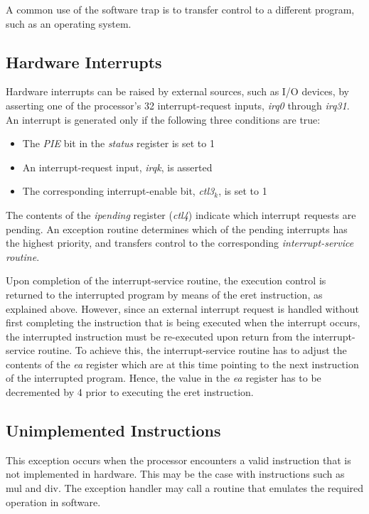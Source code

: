 \documentclass[11pt, twoside, pdftex]{article}
\begin{document}
A common use of the software trap is to transfer control to a different program,
such as an operating system.

\subsection{Hardware Interrupts}
\label{sec:interrupts}

Hardware interrupts can be raised by external sources, such as I/O devices,
by asserting one of the processor's 32 interrupt-request inputs, {\it irq0}
through {\it irq31}. An interrupt is generated only if the following three
conditions are true:
\begin{itemize}
\item The {\it PIE} bit in the {\it status} register is set to 1
\item An interrupt-request input, {\it irqk}, is asserted
\item The corresponding interrupt-enable bit, {\it ctl3}$_k$, is set to 1
\end{itemize}
\noindent
The contents of the {\it ipending} register ({\it ctl4}) indicate which interrupt 
requests are pending. An exception routine determines which of the 
pending interrupts has the highest priority, and transfers control to the
corresponding {\it interrupt-service routine}.

Upon completion of the interrupt-service routine, the execution control 
is returned to the interrupted program by means of the {\sf eret} instruction,
as explained above. However, since an external interrupt request is handled without
first completing the instruction that is being executed when the interrupt occurs,
the interrupted instruction must be re-executed upon return from the interrupt-service
routine. To achieve this, the interrupt-service routine has to adjust the contents
of the {\it ea} register which are at this time pointing to the next instruction
of the interrupted program. Hence, the value in the {\it ea} register has to be
decremented by 4 prior to executing the {\sf eret} instruction.

\subsection{Unimplemented Instructions}

This exception occurs when the processor encounters a valid instruction that is
not implemented in hardware. This may be the case with instructions such as
{\sf mul} and {\sf div}. The exception handler may call a routine that emulates the
required operation in software.
\end{document}
